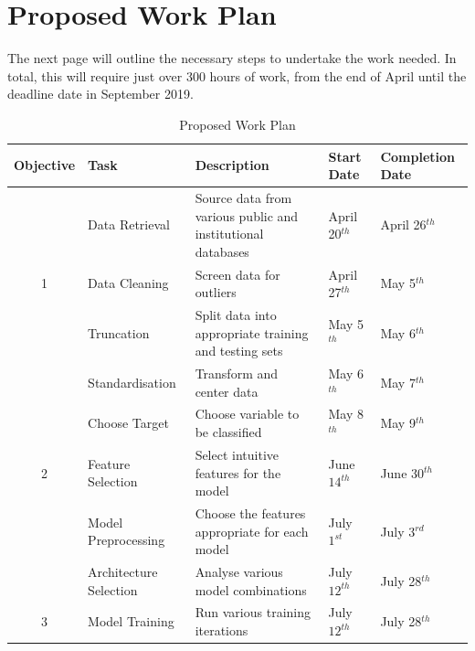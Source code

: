 \documentclass[11pt]{article}
\begin{document}
\section{Proposed Work Plan}
The next page will outline the necessary steps to undertake the work needed. In total, this will require just over 300 hours of work, from the end of April until the deadline date in September 2019.

\begin{table} \caption{Proposed Work Plan} %
\centering      %
\begin{tabular}{|c | l |l |l| l|}  %
\hline                     %
Objective         & Task                &   Description                                                                               & Start Date          & Completion Date \\ [0.5ex] %
 \hline                    %
   		   & Data Retrieval        & Source data from various public and institutional databases     & April 20$^{th}$   & April 26$^{th}$\\   %
1 & Data Cleaning         & Screen data for outliers                                                         & April 27$^{th}$    & May 5$^{th}$ \\ 
    		    & Truncation              & Split data into appropriate training and testing sets                 & May 5$^{th}$      & May 6$^{th}$ \\ 
   		   & Standardisation        & Transform and center data                                                    & May 6$^{th}$       & May 7$^{th}$ \\
\hline
   		  & Choose Target        & Choose variable to be classified                                              & May 8$^{th}$ & May 9$^{th}$\\ 
2  		& Feature Selection    & Select intuitive features for the model                                    & June $14^{th}$ & June 30$^{th}$\\ 
    		& Model Preprocessing & Choose the features appropriate for each model                    & July $1^{st}$ & July 3$^{rd}$\\
\hline
   		& Architecture Selection & Analyse various model combinations                                  & July $12^{th}$ & July 28$^{th}$ \\
  3  		& Model Training             & Run various training iterations                                         & July $12^{th}$ & July 28$^{th}$ \\

\end{tabular}
\end{table}
\end{document}
